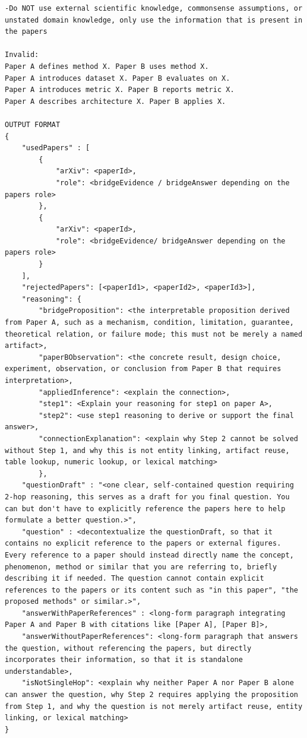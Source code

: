 \begin{lstlisting}[caption={Question–Answer generation prompt}, label={lst:questionAnswerGenerationPrompt}]
-Do NOT use external scientific knowledge, commonsense assumptions, or unstated domain knowledge, only use the information that is present in the papers

Invalid:
Paper A defines method X. Paper B uses method X.
Paper A introduces dataset X. Paper B evaluates on X.
Paper A introduces metric X. Paper B reports metric X.
Paper A describes architecture X. Paper B applies X.

OUTPUT FORMAT
{
    "usedPapers" : [
        {
            "arXiv": <paperId>,
            "role": <bridgeEvidence / bridgeAnswer depending on the papers role> 
        },
        {
            "arXiv": <paperId>,
            "role": <bridgeEvidence/ bridgeAnswer depending on the papers role>
        }
    ],
    "rejectedPapers": [<paperId1>, <paperId2>, <paperId3>],
    "reasoning": {
        "bridgeProposition": <the interpretable proposition derived from Paper A, such as a mechanism, condition, limitation, guarantee, theoretical relation, or failure mode; this must not be merely a named artifact>,
        "paperBObservation": <the concrete result, design choice, experiment, observation, or conclusion from Paper B that requires interpretation>,
        "appliedInference": <explain the connection>,
        "step1": <Explain your reasoning for step1 on paper A>,
        "step2": <use step1 reasoning to derive or support the final answer>,
        "connectionExplanation": <explain why Step 2 cannot be solved without Step 1, and why this is not entity linking, artifact reuse, table lookup, numeric lookup, or lexical matching>
        },
    "questionDraft" : "<one clear, self-contained question requiring 2-hop reasoning, this serves as a draft for you final question. You can but don't have to explicitly reference the papers here to help formulate a better question.>",
    "question" : <decontextualize the questionDraft, so that it contains no explicit reference to the papers or external figures. Every reference to a paper should instead directly name the concept, phenomenon, method or similar that you are referring to, briefly describing it if needed. The question cannot contain explicit references to the papers or its content such as "in this paper", "the proposed methods" or similar.>",
    "answerWithPaperReferences" : <long-form paragraph integrating Paper A and Paper B with citations like [Paper A], [Paper B]>,
    "answerWithoutPaperReferences": <long-form paragraph that answers the question, without referencing the papers, but directly incorporates their information, so that it is standalone understandable>,
    "isNotSingleHop": <explain why neither Paper A nor Paper B alone can answer the question, why Step 2 requires applying the proposition from Step 1, and why the question is not merely artifact reuse, entity linking, or lexical matching>
}


\end{lstlisting}
